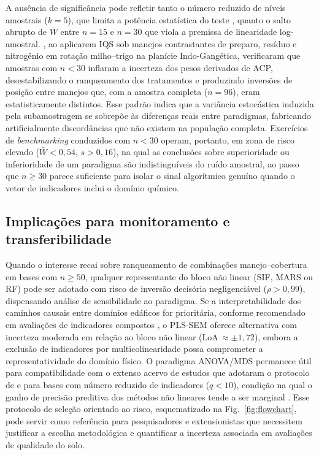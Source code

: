 \documentclass[pdflatex,sn-basic]{sn-jnl}%
\begin{document}
A ausência de significância pode refletir tanto o número reduzido de níveis amostrais ($k = 5$), que limita a potência estatística do teste \cite{Mundform2005}, quanto o salto abrupto de $\bar{W}$ entre $n = 15$ e $n = 30$ que viola a premissa de linearidade log-amostral. \cite{Adak2023}, ao aplicarem IQS sob manejos contrastantes de preparo, resíduo e nitrogênio em rotação milho--trigo na planície Indo-Gangética, verificaram que amostras com $n < 30$ inflaram a incerteza dos pesos derivados de ACP, desestabilizando o ranqueamento dos tratamentos e produzindo inversões de posição entre manejos que, com a amostra completa ($n = 96$), eram estatisticamente distintos. Esse padrão indica que a variância estocástica induzida pela subamostragem se sobrepõe às diferenças reais entre paradigmas, fabricando artificialmente discordâncias que não existem na população completa. Exercícios de \textit{benchmarking} conduzidos com $n < 30$ operam, portanto, em zona de risco elevado ($\bar{W} < 0{,}54$, $s > 0{,}16$), na qual as conclusões sobre superioridade ou inferioridade de um paradigma são indistinguíveis do ruído amostral, ao passo que $n \geq 30$ parece suficiente para isolar o sinal algorítmico genuíno quando o vetor de indicadores inclui o domínio químico.

\subsection{Implicações para monitoramento e transferibilidade}\label{subsec:implications}

Quando o interesse recai sobre ranqueamento de combinações manejo--cobertura em bases com $n \geq 50$, qualquer representante do bloco não linear (SIF, MARS ou RF) pode ser adotado com risco de inversão decisória negligenciável ($\rho > 0{,}99$), dispensando análise de sensibilidade ao paradigma. Se a interpretabilidade dos caminhos causais entre domínios edáficos for prioritária, conforme recomendado em avaliações de indicadores compostos \cite{Cardoso2013}, o PLS-SEM oferece alternativa com incerteza moderada em relação ao bloco não linear (LoA\,$\approx \pm 1{,}72$), embora a exclusão de indicadores por multicolinearidade possa comprometer a representatividade do domínio físico. O paradigma ANOVA/MDS permanece útil para compatibilidade com o extenso acervo de estudos que adotaram o protocolo de \cite{Andrews2002} e para bases com número reduzido de indicadores ($q < 10$), condição na qual o ganho de precisão preditiva dos métodos não lineares tende a ser marginal \cite{Bünemann2018}. Esse protocolo de seleção orientado ao risco, esquematizado na Fig.~\ref{fig:flowchart}, pode servir como referência para pesquisadores e extensionistas que necessitem justificar a escolha metodológica e quantificar a incerteza associada em avaliações de qualidade do solo.
\end{document}
